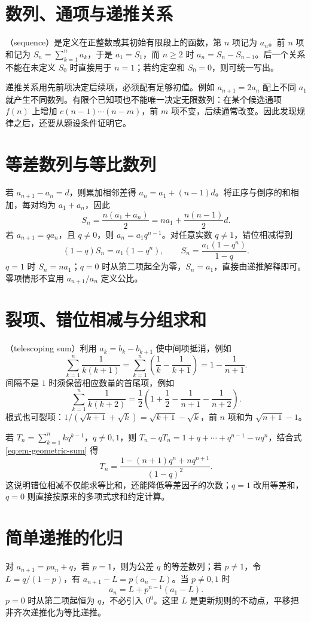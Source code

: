\documentclass[UTF8]{ctexbook}
\begin{document}
\section{数列、通项与递推关系}
（sequence）是定义在正整数或其初始有限段上的函数，第 $n$ 项记为 $a_n$。前 $n$ 项和记为 $S_n=\sum_{k=1}^n a_k$，于是 $a_1=S_1$，而 $n\ge2$ 时 $a_n=S_n-S_{n-1}$。后一个关系不能在未定义 $S_0$ 时直接用于 $n=1$；若约定空和 $S_0=0$，则可统一写出。

递推关系用先前项决定后续项，必须配有足够初值。例如 $a_{n+1}=2a_n$ 配上不同 $a_1$ 就产生不同数列。有限个已知项也不能唯一决定无限数列：在某个候选通项 $f(n)$ 上增加 $c(n-1)\cdots(n-m)$，前 $m$ 项不变，后续通常改变。因此发现规律之后，还要从题设条件证明它。

\section{等差数列与等比数列}
若 $a_{n+1}-a_n=d$，则累加相邻差得 $a_n=a_1+(n-1)d$。将正序与倒序的和相加，每对均为 $a_1+a_n$，因此
\[
 S_n=\frac{n(a_1+a_n)}2=na_1+\frac{n(n-1)}2d.
\]
若 $a_{n+1}=qa_n$，且 $q\ne0$，则 $a_n=a_1q^{n-1}$。对任意实数 $q\ne1$，错位相减得到
\begin{equation}\label{eq:em-geometric-sum}
 (1-q)S_n=a_1(1-q^n),\qquad
 S_n=\frac{a_1(1-q^n)}{1-q}.
\end{equation}
$q=1$ 时 $S_n=na_1$；$q=0$ 时从第二项起全为零，$S_n=a_1$，直接由递推解释即可。零项情形不宜用 $a_{n+1}/a_n$ 定义公比。

\section{裂项、错位相减与分组求和}
（telescoping sum）利用 $a_k=b_k-b_{k+1}$ 使中间项抵消，例如
\[
 \sum_{k=1}^n\frac1{k(k+1)}
 =\sum_{k=1}^n\left(\frac1k-\frac1{k+1}\right)
 =1-\frac1{n+1}.
\]
间隔不是 $1$ 时须保留相应数量的首尾项，例如
\[
 \sum_{k=1}^n\frac1{k(k+2)}
 =\frac12\left(1+\frac12-\frac1{n+1}-\frac1{n+2}\right).
\]
根式也可裂项：$1/(\sqrt{k+1}+\sqrt k)=\sqrt{k+1}-\sqrt k$，前 $n$ 项和为 $\sqrt{n+1}-1$。

若 $T_n=\sum_{k=1}^n kq^{k-1}$，$q\ne0,1$，则 $T_n-qT_n=1+q+\cdots+q^{n-1}-nq^n$，结合式 \eqref{eq:em-geometric-sum} 得
\[
 T_n=\frac{1-(n+1)q^n+nq^{n+1}}{(1-q)^2}.
\]
这说明错位相减不仅能求等比和，还能降低等差因子的次数；$q=1$ 改用等差和，$q=0$ 则直接按原来的多项式求和约定计算。

\section{简单递推的化归}
对 $a_{n+1}=pa_n+q$，若 $p=1$，则为公差 $q$ 的等差数列；若 $p\ne1$，令 $L=q/(1-p)$，有 $a_{n+1}-L=p(a_n-L)$。当 $p\ne0,1$ 时
\[
 a_n=L+p^{n-1}(a_1-L).
\]
$p=0$ 时从第二项起恒为 $q$，不必引入 $0^0$。这里 $L$ 是更新规则的不动点，平移把非齐次递推化为等比递推。
\end{document}
